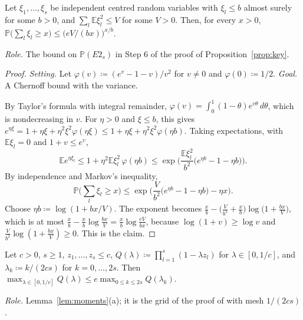 \documentclass[11pt]{article}
\newcommand{\E}{\mathbb{E}}
\newcommand{\Prob}{\mathbb{P}}
\begin{document}
\begin{lemma}\label{lem:bennett}
Let $\xi_1,\dots,\xi_s$ be independent centred random variables with $\xi_l\le b$ almost surely for
some $b>0$, and $\sum_l\E\xi_l^2\le V$ for some $V>0$. Then, for every $x>0$,
$\Prob\big(\sum_l\xi_l\ge x\big)\le\big(eV/(bx)\big)^{x/b}$.
\end{lemma}

\emph{Role.} The bound on $\Prob(E2_s)$ in Step 6 of the proof of Proposition~\ref{prop:key}.

\begin{proof}
\emph{Setting.} Let $\varphi(v)\coloneqq(e^v-1-v)/v^2$ for $v\ne0$ and $\varphi(0)\coloneqq1/2$.
\emph{Goal.} A Chernoff bound with the variance.

By Taylor's formula with integral remainder, $\varphi(v)=\int_0^1(1-\theta)e^{v\theta}\,d\theta$,
which is nondecreasing in $v$. For $\eta>0$ and $\xi\le b$, this gives
$e^{\eta\xi}=1+\eta\xi+\eta^2\xi^2\varphi(\eta\xi)\le1+\eta\xi+\eta^2\xi^2\varphi(\eta b)$. Taking
expectations, with $\E\xi_l=0$ and $1+v\le e^v$,
\[
  \E e^{\eta\xi_l}\le1+\eta^2\E\xi_l^2\,\varphi(\eta b)\le\exp\Big(\frac{\E\xi_l^2}{b^2}\big(e^{\eta b}-1-\eta b\big)\Big).
\]
By independence and Markov's inequality,
\[
  \Prob\Big(\sum_l\xi_l\ge x\Big)\le\exp\Big(\frac V{b^2}\big(e^{\eta b}-1-\eta b\big)-\eta x\Big).
\]
Choose $\eta b\coloneqq\log(1+bx/V)$. The exponent becomes
$\frac xb-\big(\frac V{b^2}+\frac xb\big)\log\big(1+\frac{bx}V\big)$, which is at most
$\frac xb-\frac xb\log\frac{bx}{V}=\frac xb\log\frac{eV}{bx}$, because $\log(1+v)\ge\log v$ and
$\frac V{b^2}\log(1+\frac{bx}{V})\ge0$. This is the claim.
\end{proof}

\begin{lemma}\label{lem:grid}
Let $c>0$, $s\ge1$, $z_1,\dots,z_s\le c$, $Q(\lambda)\coloneqq\prod_{l=1}^s(1-\lambda z_l)$ for
$\lambda\in[0,1/c]$, and $\lambda_k\coloneqq k/(2cs)$ for $k=0,\dots,2s$. Then
$\max_{\lambda\in[0,1/c]}Q(\lambda)\le e\max_{0\le k\le2s}Q(\lambda_k)$.
\end{lemma}

\emph{Role.} Lemma~\ref{lem:moments}(a); it is the grid of the proof of \citet[Proposition~11]{HT15}
with mesh $1/(2cs)$.
\end{document}

